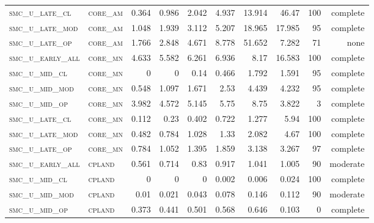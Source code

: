 \begin{landscape}
\begin{center}
\begin{footnotesize}
\begin{longtable}{llrrrrr|rrr}
\textsc{smc\_u\_late\_cl  } & \textsc{core\_am  }   & 0.364    & 0.986    & 2.042    & 4.937    & 13.914   & 46.47         & 100           & complete        \\
\textsc{smc\_u\_late\_mod } & \textsc{core\_am  }   & 1.048    & 1.939    & 3.112    & 5.207    & 18.965   & 17.985        & 95            & complete        \\
\textsc{smc\_u\_late\_op  } & \textsc{core\_am  }   & 1.766    & 2.848    & 4.671    & 8.778    & 51.652   & 7.282         & 71            & none        \\
\textsc{smc\_u\_early\_all} & \textsc{core\_mn  }   & 4.633    & 5.582    & 6.261    & 6.936    & 8.17     & 16.583        & 100           & complete        \\
\textsc{smc\_u\_mid\_cl   } & \textsc{core\_mn  }   & 0        & 0        & 0.14     & 0.466    & 1.792    & 1.591         & 95            & complete        \\
\textsc{smc\_u\_mid\_mod  } & \textsc{core\_mn  }   & 0.548    & 1.097    & 1.671    & 2.53     & 4.439    & 4.232         & 95            & complete        \\
\textsc{smc\_u\_mid\_op   } & \textsc{core\_mn  }   & 3.982    & 4.572    & 5.145    & 5.75     & 8.75     & 3.822         & 3             & complete        \\
\textsc{smc\_u\_late\_cl  } & \textsc{core\_mn  }   & 0.112    & 0.23     & 0.402    & 0.722    & 1.277    & 5.94          & 100           & complete        \\
\textsc{smc\_u\_late\_mod } & \textsc{core\_mn  }   & 0.482    & 0.784    & 1.028    & 1.33     & 2.082    & 4.67          & 100           & complete        \\
\textsc{smc\_u\_late\_op  } & \textsc{core\_mn  }   & 0.784    & 1.052    & 1.395    & 1.859    & 3.138    & 3.267         & 97            & complete        \\
\textsc{smc\_u\_early\_all} & \textsc{cpland    }   & 0.561    & 0.714    & 0.83     & 0.917    & 1.041    & 1.005         & 90            & moderate        \\
\textsc{smc\_u\_mid\_cl   } & \textsc{cpland    }   & 0        & 0        & 0        & 0.002    & 0.006    & 0.024         & 100           & complete        \\
\textsc{smc\_u\_mid\_mod  } & \textsc{cpland    }   & 0.01     & 0.021    & 0.043    & 0.078    & 0.146    & 0.112         & 90            & moderate        \\
\textsc{smc\_u\_mid\_op   } & \textsc{cpland    }   & 0.373    & 0.441    & 0.501    & 0.568    & 0.646    & 0.103         & 0             & complete            \\

\end{longtable}
\end{footnotesize}
\end{center}
\end{landscape}
